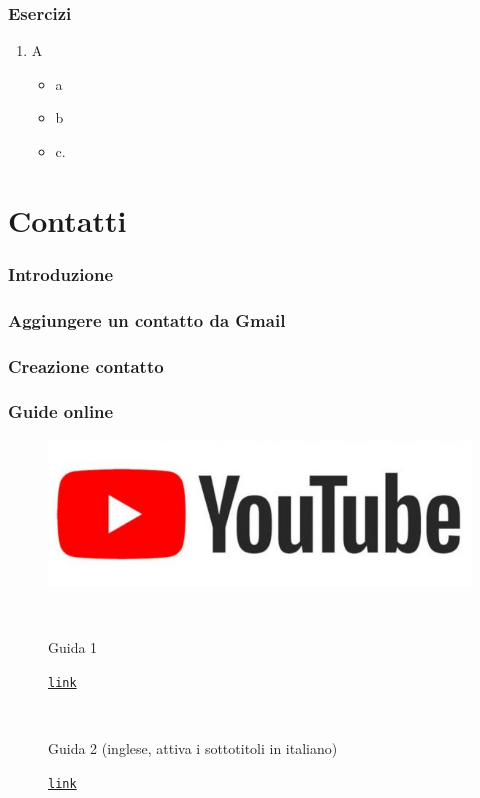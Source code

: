 \documentclass[handout]{beamer}
\begin{document}
\begin{frame}
\frametitle{Esercizi}
\begin{enumerate}
  \item A
  \begin{itemize}
    \item a
    \item b
    \item c.
  \end{itemize}
\end{enumerate}
\end{frame}

\section{Contatti}

\begin{frame}
\frametitle{Introduzione}

\end{frame}




\begin{frame}
\frametitle{Aggiungere un contatto da Gmail}

\end{frame}





\begin{frame}
\frametitle{Creazione contatto}

\end{frame}




\begin{frame}
\frametitle{Guide online}
\begin{figure}
\includegraphics[width=.5\columnwidth]{img/ytlogo.jpg}

~

Guida 1

\href{link}{\texttt{link}}

~

Guida 2 (inglese, attiva i sottotitoli in italiano)

\href{link}{\texttt{link}}
\end{figure}
\end{frame}
\end{document}
